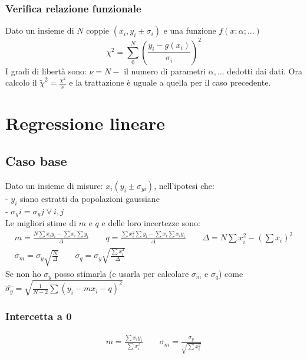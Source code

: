 \documentclass[11pt]{article}
\begin{document}
    \subsubsection{Verifica relazione funzionale}
    Dato un insieme di $N$ coppie $(x_i, y_i \pm \sigma_i)$ e una funzione $f(x; \alpha; \dots )$
    \[ \chi^2 = \sum_{0}^{N} \left( \frac{y_i - g(x_i)}{\sigma_i} \right)^2 \]
    I gradi di libertà sono: $\nu = N - $ il numero di parametri $\alpha, \dots$ dedotti dai dati.
    Ora calcolo il $\tilde{\chi}^2 = \frac{\chi^2}{\nu} $ e la trattazione è uguale a quella per il caso precedente.

    \section{Regressione lineare}
    \subsection{Caso base}
    Dato un insieme di misure: $x_i (y_i \pm \sigma_{yi}) $, nell'ipotesi che: \\
    - $y_i$ siano estratti da popolazioni gaussiane \\
    - $\sigma_yi = \sigma_yj \; \forall \: i,j $ \\
    Le migliori stime di $m$ e $q$ e delle loro incertezze sono:
    \begin{gather*}
        m = \frac{N \sum x_i y_i - \sum x_i \sum y_i}{\Delta}\qquad
        q = \frac{\sum x_i^2 \sum y_i  - \sum x_i \sum x_i y_i}{\Delta} \qquad
        \Delta = N \sum x_i^2 - \left( \sum x_i \right)^2 \\
        \sigma_m = \sigma_y \sqrt {\frac{N}{\Delta}} \qquad
        \sigma_q = \sigma_y \sqrt {\frac{\sum x_i^2}{\Delta}}
    \end{gather*}
    Se non ho $\sigma_y$ posso stimarla (e usarla per calcolare $\sigma_m$ e $\sigma_q$) come
    $ \hat{\sigma_y} = \sqrt {\frac{1}{N - 2} \sum \left( y_i - mx_i - q \right)^2} $

    \subsubsection{Intercetta a 0}
    \begin{gather*}
        m = \frac{\sum x_i y_i}{\sum x_i^2} \qquad \sigma_m = \frac{\sigma_y}{\sqrt{\sum x_i^2}}
    \end{gather*}
\end{document}
